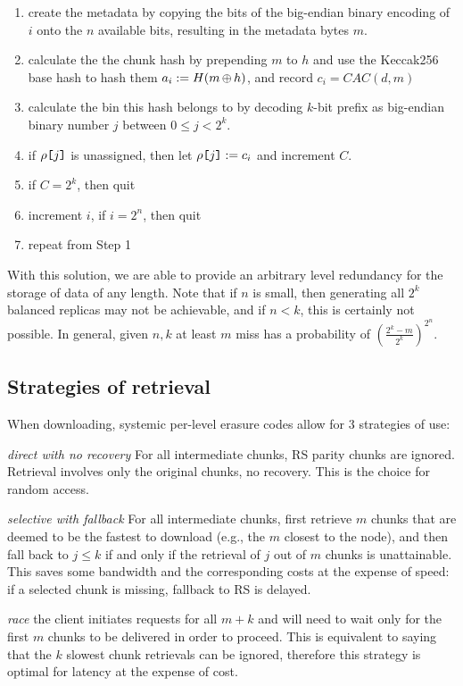 \begin{enumerate}[noitemsep]
    \item create the metadata by copying the bits of the big-endian binary encoding of $i$ onto the $n$ available bits, resulting in the metadata bytes $m$.
    \item calculate the the chunk hash by prepending      $m$ to $h$ and use the Keccak256 base hash to hash them $a_i:=H(m\operatorname{\operatorname{\oplus}} h)$, and record $c_i=\mathit{CAC}(d,m)$
    \item calculate the bin this hash belongs to by decoding $k$-bit prefix as big-endian binary number $j$ between $0\leq j<2^k$.
    \item if $\rho\texttt{[}\/j\/\texttt{]}$ is unassigned, then let $\rho\texttt{[}\/j\/\texttt{]}:=c_i$ and increment $C$.
    \item if $C=2^k$, then quit
    \item increment $i$, if $i=2^n$, then quit
    \item repeat from Step 1 
\end{enumerate}

With this solution, we are able to provide an arbitrary level redundancy for the storage of data of any length. Note that if $n$ is small, then generating all $2^k$ balanced replicas may not be achievable, and if $n<k$, this is certainly not possible.
In general, given $n, k$ at least $m$ miss has a probability of $\left(\frac{2^k-m}{2^k}\right)^{2^n}$.


\subsection{Strategies of retrieval}
\label{sec:strategies}

When downloading, systemic per-level erasure codes allow for 3 strategies of use:
\begin{labelledlist}
      \item[\emph{direct with no recovery}] For all intermediate chunks, RS parity chunks are ignored. Retrieval involves  only the original chunks, no recovery. This is the choice for random access.
\item[\emph{selective with fallback}] For all intermediate chunks, first retrieve $ m$ chunks that are deemed to be the fastest to download (e.g., the $m$ closest to the node), and then fall back to $j\leq k$ if and only if the retrieval of $j$ out of $m$ chunks is unattainable. This saves
some bandwidth and the corresponding costs at the expense of speed: if a selected chunk
is missing, fallback to RS is delayed.
\item[\emph{race}] the client initiates requests for all $m+k$ and will need to wait only for the first $m$ chunks to be delivered in order to proceed. This is equivalent to saying that the  $k$ slowest chunk retrievals can be ignored, therefore this strategy is optimal for latency at the expense of cost.
\end{labelledlist}

